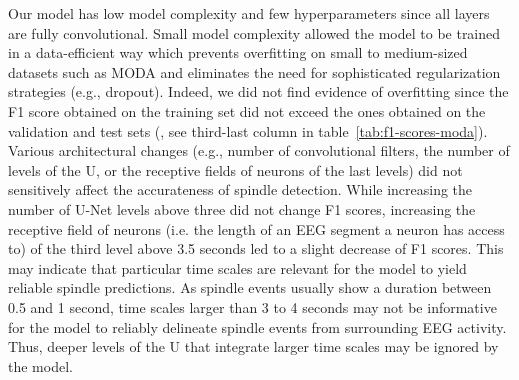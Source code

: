 \documentclass[fleqn,twocolumn,10pt]{wlscirep}
\begin{document}
Our model has low model complexity and few hyperparameters since all layers are
fully convolutional.
Small model complexity allowed the model to be trained in a data-efficient way
which prevents overfitting on small to medium-sized datasets such as MODA and
eliminates the need for sophisticated regularization strategies (e.g., dropout).
Indeed, we did not find evidence of overfitting since the F1 score obtained on
the training set did not exceed the ones obtained on the validation and test
sets (, see third-last column in table~\ref{tab:f1-scores-moda}).
Various architectural changes (e.g., number of convolutional filters, the number
of levels of the U, or the receptive fields of neurons of the last levels) did
not sensitively affect the accurateness of spindle detection.
While increasing the number of U-Net levels above three did not change F1
scores, increasing the receptive field of neurons (i.e. the length of an EEG
segment a neuron has access to) of the third level above 3.5 seconds led to a
slight decrease of F1 scores.
This may indicate that particular time scales are relevant for the model to yield
reliable spindle predictions.
As spindle events usually show a duration between 0.5 and 1
second\cite{Lacourse2020}, time scales larger than 3 to 4 seconds may not be
informative for the model to reliably delineate spindle events from surrounding
EEG activity.
Thus, deeper levels of the U that integrate larger time scales may be ignored by
the model.
\end{document}
